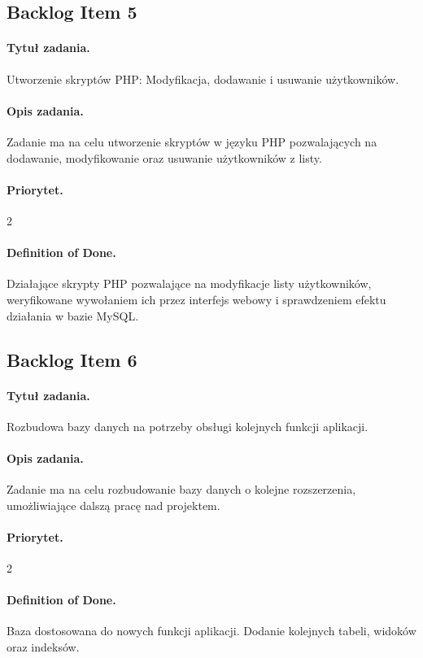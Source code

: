 \documentclass[a4paper]{article}
\begin{document}
\subsection{Backlog Item 5}
\paragraph{Tytuł zadania.} Utworzenie skryptów PHP: Modyfikacja, dodawanie i usuwanie użytkowników.
\paragraph{Opis zadania.} Zadanie ma na celu utworzenie skryptów w języku PHP pozwalających na dodawanie, modyfikowanie oraz usuwanie użytkowników z listy.
\paragraph{Priorytet.} 2
\paragraph{Definition of Done.} Działające skrypty PHP pozwalające na modyfikacje listy użytkowników, weryfikowane wywołaniem ich przez interfejs webowy i sprawdzeniem efektu działania w bazie MySQL.

\subsection{Backlog Item 6}
\paragraph{Tytuł zadania.}Rozbudowa bazy danych na potrzeby obsługi kolejnych funkcji aplikacji.
\paragraph{Opis zadania.}Zadanie ma na celu rozbudowanie bazy danych o kolejne rozszerzenia, umożliwiające dalszą pracę nad projektem.
\paragraph{Priorytet.}2
\paragraph{Definition of Done.}Baza dostosowana do nowych funkcji aplikacji. Dodanie kolejnych tabeli, widoków oraz indeksów.
\end{document}
